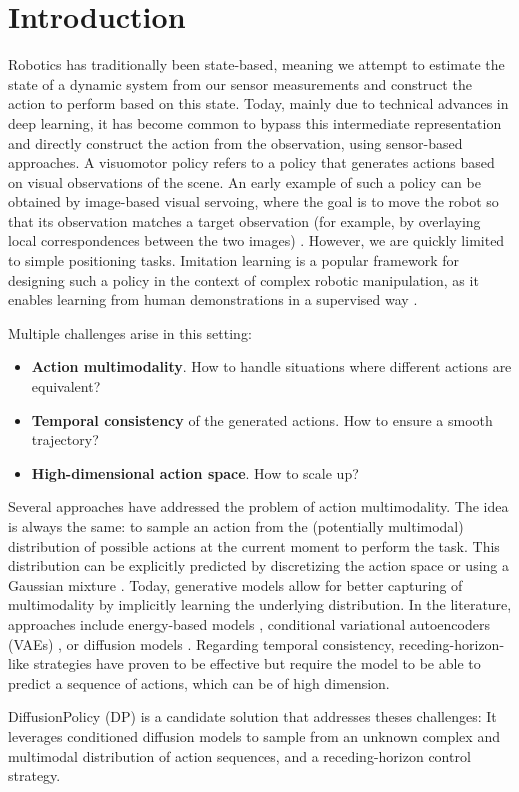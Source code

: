 \section{Introduction}
\label{sec:intro}

Robotics has traditionally been state-based, meaning we attempt to estimate the state of a dynamic system
from our sensor measurements and construct the action to perform based on this state.
Today, mainly due to technical advances in deep learning, it has become common to bypass this intermediate
representation and directly construct the action from the observation, using sensor-based approaches.
A visuomotor policy refers to a policy that generates actions based on
visual observations of the scene.
An early example of such a policy can be obtained by image-based visual servoing,
where the goal is to move the robot so that its observation matches a target observation
(for example, by overlaying local correspondences between the two images) \cite{chaumette_visual_2006}.
However, we are quickly limited to simple positioning tasks.
Imitation learning is a popular framework for designing
such a policy in the context of complex robotic manipulation, as it enables learning from human demonstrations
in a supervised way \cite{florence_implicit_2021,zhao_learning_2023}.

\vspace{0.5em}
Multiple challenges arise in this setting:
\begin{itemize}
    \item \textbf{Action multimodality}. How to handle situations where different actions are equivalent?
    \item \textbf{Temporal consistency} of the generated actions. How to ensure a smooth trajectory?
    \item \textbf{High-dimensional action space}. How to scale up?
\end{itemize}

\vspace{0.5em}
Several approaches have addressed the problem of action multimodality.
The idea is always the same: to sample an action from the (potentially multimodal) distribution of
possible actions at the current moment to perform the task.
This distribution can be explicitly predicted by discretizing the action space \cite{shafiullah_behavior_2022} or
using a Gaussian mixture \cite{mandlekar_what_2021}.
Today, generative models allow for better capturing of multimodality by implicitly learning the
underlying distribution. In the literature, approaches include energy-based models \cite{florence_implicit_2021},
conditional variational autoencoders (VAEs) \cite{zhao_learning_2023}, or diffusion models \cite{chi2023diffusion}.
Regarding temporal consistency, receding-horizon-like strategies have proven to be effective but require
the model to be able to predict a sequence of actions, which can be of high dimension.

\vspace{0.5em}
DiffusionPolicy (DP) \cite{chi2023diffusion} is a candidate solution that addresses theses challenges:
It leverages conditioned diffusion models to sample from an unknown complex and
multimodal distribution of action sequences, and a receding-horizon control strategy.

